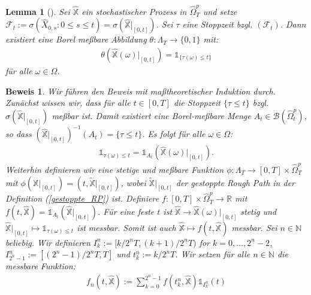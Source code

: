 \documentclass[12pt,titlepage,headsepline]{article}
\newtheorem*{lemma-non}{Lemma}
\newtheorem*{beweis-non}{Beweis}
\begin{document}
      \begin{lemma-non}[\cite{bayer_optimal_2020,Lemma 3.2}]
        Sei $\hat{\mathbb{X}}$ ein stochastischer Prozess in $\hat{\Omega}_T^p$ und setze $\mathcal{F}_t:=\sigma(\hat{X}_{0,s} : 0 \leq s \leq t) = \sigma(\hat{\mathbb{X}}\rvert_{[0,t]})$. Sei $\tau$ eine Stoppzeit bzgl. $(\mathcal{F}_t)$. Dann existiert eine Borel meßbare Abbildung $\theta: \Lambda_T \rightarrow \{0,1\}$ mit:
        \begin{align*}
          \theta(\hat{\mathbb{X}}(\omega)\rvert_{[0,t]})=\mathds{1}_{\{\tau(\omega)\leq t\}}
        \end{align*}
        für alle $\omega \in \Omega$.
      \end{lemma-non}
      \begin{beweis-non}
        \textup{
        Wir führen den Beweis mit maßtheoretischer Induktion durch. Zunächst wissen wir, dass für alle $t \in [0,T]$ die Stoppzeit $\{ \tau \leq t\}$ bzgl. $\sigma(\hat{\mathbb{X}}\lvert_{[0,t]})$ meßbar ist. Damit existiert eine Borel-meßbare Menge $A_t \in \mathcal{B}(\hat{\Omega}_t^p)$, so dass $(\hat{\mathbb{X}}\lvert_{[0,t]})^{-1}(A_t)=\{ \tau \leq t\}$. Es folgt für alle $\omega \in \Omega$:
        \begin{align*}
          \mathds{1}_{\tau(\omega)\leq t} = \mathds{1}_{A_t}(\hat{\mathbb{X}}(\omega)\lvert_{[0,t]}).
        \end{align*}
        Weiterhin definieren wir eine stetige und meßbare Funktion $\phi : \Lambda_T \rightarrow [0,T] \times \hat{\Omega}_T^p$ mit $\phi(\mathbb{X}\lvert_{[0,t]}) = (t,\tilde{\mathbb{X}}\lvert_{[0,t]})$, wobei $\tilde{\mathbb{X}}\lvert_{[0,t]}$ der gestoppte Rough Path in der Definition (\ref{gestoppte_RP}) ist. Definiere $f: [0,T]\times \hat{\Omega}_T^p \rightarrow \mathbb{R}$ mit $f(t,\hat{\mathbb{X}}) = \mathds{1}_{A_t}(\hat{\mathbb{X}}\lvert_{[0,t]})$. Für eine feste $t$ ist $\hat{\mathbb{X}} \rightarrow \hat{\mathbb{X}}(\omega)\lvert_{[0,t]}$ stetig und $\hat{\mathbb{X}}\lvert_{[0,t]} \mapsto \mathds{1}_{\tau(\omega)\leq t}$ ist messbar. Somit ist auch $\hat{\mathbb{X}} \mapsto f(t,\hat{\mathbb{X}})$ messbar.
        \hfill\break
        Sei $n \in \mathbb{N}$ beliebig. Wir definieren $I^n_k := [k/2^nT,(k+1)/2^nT)$ for $k=0,\ldots,2^n-2$, $I^n_{2^n-1} := [(2^n-1)/2^nT,T]$ und $t^n_k := k/2^nT$. Wir setzen für alle $n \in \mathbb{N}$ die messbare Funktion:
        \begin{align*}
          f_n(t,\hat{\mathbb{X}}) := \sum_{k=0}^{2^n-1} f(t_k^n,\hat{\mathbb{X}})\mathds{1}_{I^n_k}(t)
        \end{align*}
}
\end{beweis-non}
\end{document}
